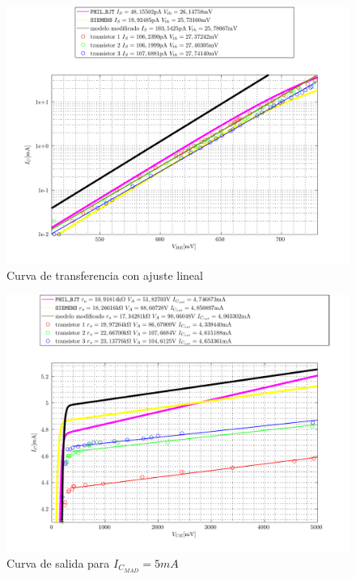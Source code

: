 \documentclass[10pt,spanish,a4paper,openany,notitlepage]{article}
\begin{document}
\begin{figure}[H] %
\begin{center}
\includegraphics[scale=0.7]{./Octave/IdvsVbe_recta.pdf}
\caption{Curva de transferencia con ajuste lineal}
 \label{fig:transferencia_lineal}
\end{center}
\end{figure}

\begin{figure}[H] %
\begin{center}
\includegraphics[scale=0.7]{./Octave/IcvsVce_5mA.pdf}
\caption{Curva de salida para $I_{C_{MAD}} = 5\unit{mA}$}
 \label{fig:salida_5ma}
\end{center}
\end{figure}
\end{document}
